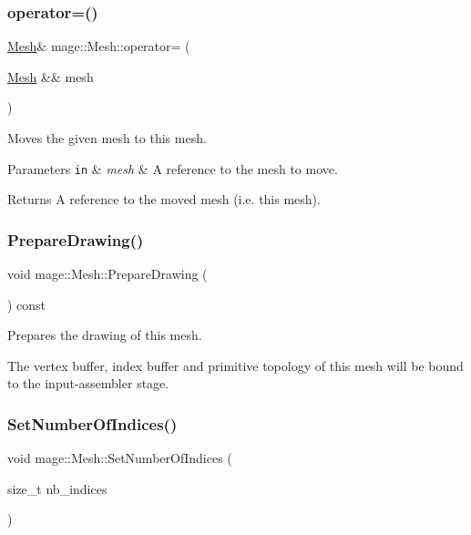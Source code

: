 \subsubsection{\texorpdfstring{operator=()}{operator=()}\hspace{0.1cm}{\footnotesize\ttfamily [2/2]}}
{\footnotesize\ttfamily \hyperlink{classmage_1_1_mesh}{Mesh}\& mage\+::\+Mesh\+::operator= (\begin{DoxyParamCaption}\item[{\hyperlink{classmage_1_1_mesh}{Mesh} \&\&}]{mesh }\end{DoxyParamCaption})\hspace{0.3cm}{\ttfamily [delete]}}

Moves the given mesh to this mesh.


\begin{DoxyParams}[1]{Parameters}
\mbox{\tt in}  & {\em mesh} & A reference to the mesh to move. \\
\hline
\end{DoxyParams}
\begin{DoxyReturn}{Returns}
A reference to the moved mesh (i.\+e. this mesh). 
\end{DoxyReturn}
\hypertarget{classmage_1_1_mesh_a728979ae0be55283813eecf3e7c40e80}{}\label{classmage_1_1_mesh_a728979ae0be55283813eecf3e7c40e80} 
\subsubsection{\texorpdfstring{Prepare\+Drawing()}{PrepareDrawing()}}
{\footnotesize\ttfamily void mage\+::\+Mesh\+::\+Prepare\+Drawing (\begin{DoxyParamCaption}{ }\end{DoxyParamCaption}) const}

Prepares the drawing of this mesh.

The vertex buffer, index buffer and primitive topology of this mesh will be bound to the input-\/assembler stage. \hypertarget{classmage_1_1_mesh_a19336d13ef5219c196678b8fdf4cca2b}{}\label{classmage_1_1_mesh_a19336d13ef5219c196678b8fdf4cca2b} 
\subsubsection{\texorpdfstring{Set\+Number\+Of\+Indices()}{SetNumberOfIndices()}}
{\footnotesize\ttfamily void mage\+::\+Mesh\+::\+Set\+Number\+Of\+Indices (\begin{DoxyParamCaption}\item[{size\+\_\+t}]{nb\+\_\+indices }\end{DoxyParamCaption})\hspace{0.3cm}{\ttfamily [protected]}}

